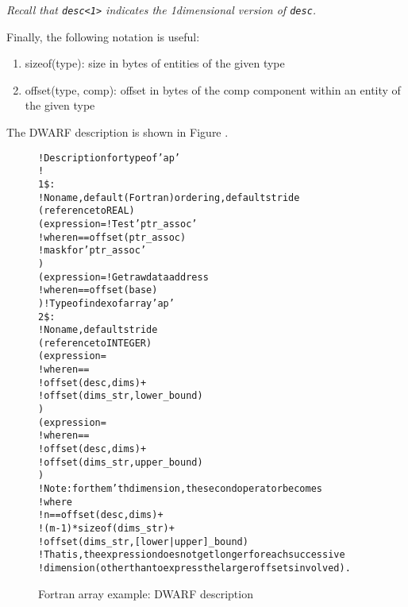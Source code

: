 \textit{
Recall that \texttt{desc\textless 1\textgreater} 
indicates the 1\dash dimensional version of \texttt{desc}.
}

Finally, the following notation is useful:
\begin{enumerate}[1. ]
\item  sizeof(type): size in bytes of entities of the given type
\item offset(type, comp): offset in bytes of the comp component
within an entity of the given type
\end{enumerate}

The DWARF description is shown 
in Figure .

\begin{figure}[ht]
\begin{dwflisting}
\begin{alltt}
! Description for type of 'ap'
!
1\$: \DWTAGarraytype
        ! No name, default (Fortran) ordering, default stride
        \DWATtype(reference to REAL)
        \DWATassociated(expression=    ! Test 'ptr\_assoc' 
            \DWOPpushobjectaddress
            \DWOPlitn                ! where n == offset(ptr\_assoc)
            \DWOPplus
            \DWOPderef
            \DWOPlitone                  ! mask for 'ptr\_assoc' 
            \DWOPand)
        \DWATdatalocation(expression= ! Get raw data address
            \DWOPpushobjectaddress
            \DWOPlitn                ! where n == offset(base)
            \DWOPplus
            \DWOPderef)                ! Type of index of array 'ap'
2\$:     \DWTAGsubrangetype
            ! No name, default stride
            \DWATtype(reference to INTEGER)
            \DWATlowerbound(expression=
                \DWOPpushobjectaddress
                \DWOPlitn             ! where n ==
                                         !   offset(desc, dims) +
                                         !   offset(dims\_str, lower\_bound)
                \DWOPplus
                \DWOPderef)
            \DWATupperbound(expression=
                \DWOPpushobjectaddress
                \DWOPlitn            ! where n ==
                                        !   offset(desc, dims) +
                                        !   offset(dims\_str, upper\_bound)
                \DWOPplus
                \DWOPderef)
            !  Note: for the m'th dimension, the second operator becomes
            !  \DWOPlitn where
            !       n == offset(desc, dims)          +
            !                (m-1)*sizeof(dims\_str)  +
            !                 offset(dims\_str, [lower|upper]\_bound)
            !  That is, the expression does not get longer for each successive 
            !  dimension (other than to express the larger offsets involved).
\end{alltt}
\end{dwflisting}
\caption{Fortran array example: DWARF description}
\label{fig:fortranarrayexampledwarfdescription}
\end{figure}

